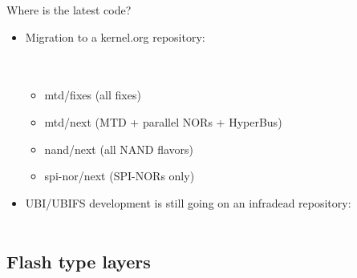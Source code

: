 \documentclass[aspectratio=169,obeyspaces,spaces,hyphens,dvipsnames]{beamer}
\begin{document}
\begin{frame}{Where is the latest code?}
  \begin{itemize}
  \item Migration to a kernel.org repository:\\
    \sout{}\\
    \\
    \begin{itemize}
    \item mtd/fixes (all fixes)
    \item mtd/next (MTD + parallel NORs + HyperBus)
    \item nand/next (all NAND flavors)
    \item spi-nor/next (SPI-NORs only)
    \end{itemize}
    \vfill
  \item UBI/UBIFS development is still going on an infradead repository:\\
    \\
  \end{itemize}
\end{frame}

\subsection{Flash type layers}
\end{document}
